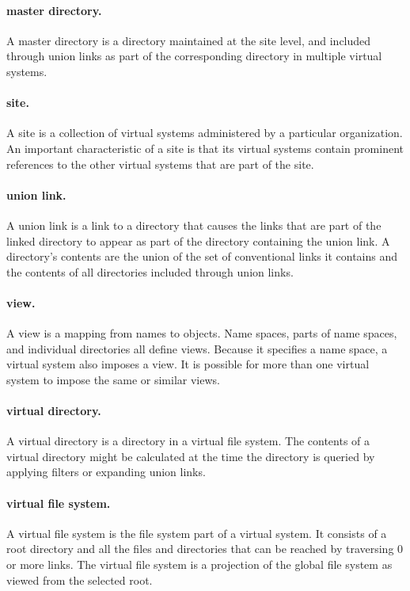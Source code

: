 \paragraph{master directory.}  A master directory is a directory
maintained at the site level, and included through union links as part
of the corresponding directory in multiple virtual systems.

\paragraph{site.}  A site is a collection of virtual systems
administered by a particular organization.  An important
characteristic of a site is that its virtual systems contain prominent
references to the other virtual systems that are part of the site.

\paragraph{union link.}  A union link is a link to a directory that
causes the links that are part of the linked directory to appear as
part of the directory containing the union link.  A directory's
contents are the union of the set of conventional links it contains
and the contents of all directories included through union links.

\paragraph{view.}  A view is a mapping from names to objects.  Name
spaces, parts of name spaces, and individual directories all define
views.  Because it specifies a name space, a virtual system also
imposes a view.  It is possible for more than one virtual system to
impose the same or similar views.

\newpage
\paragraph{virtual directory.}  A virtual directory is a directory in
a virtual file system.  The contents of a virtual directory might be
calculated at the time the directory is queried by applying filters or
expanding union links.

\paragraph{virtual file system.}  A virtual file system is the file
system part of a virtual system.  It consists of a root directory and
all the files and directories that can be reached by traversing 0 or
more links.  The virtual file system is a projection of the
global file system as viewed from the selected root.

